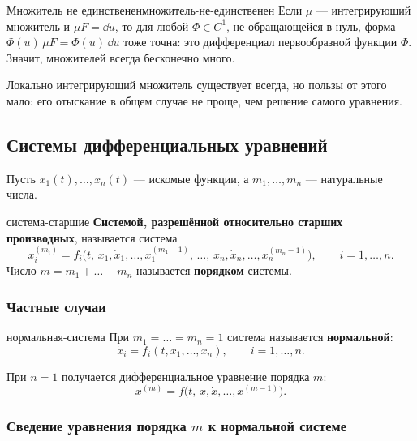\begin{Remark}[addon]{Множитель не единственен}{множитель-не-единственен}
	Если $\mu$ --- интегрирующий множитель и $\mu F = \dd u$, то для любой
	$\Phi \in C^1$, не обращающейся в нуль, форма
	$\Phi(u)\,\mu F = \Phi(u)\,\dd u$ тоже точна: это дифференциал
	первообразной функции $\Phi$. Значит, множителей всегда бесконечно много.

	\medskip
	Локально интегрирующий множитель существует всегда, но пользы от этого мало:
	его отыскание в общем случае не проще, чем решение самого уравнения.
\end{Remark}

\subsection{Системы дифференциальных уравнений}\label{sec:системы}

Пусть $x_1(t), \dots, x_n(t)$ --- искомые функции, а $m_1, \dots, m_n$ ---
натуральные числа.

\begin{Definition}{}{система-старшие}
	\textbf{Системой, разрешённой относительно старших производных},
	называется система
	\[
	x_i^{(m_i)} = f_i\bigl(t,\, x_1, \dot x_1, \dots, x_1^{(m_1-1)},\,
	\dots,\, x_n, \dot x_n, \dots, x_n^{(m_n-1)}\bigr),
	\qquad i = 1,\dots,n.
	\]
	Число $m = m_1 + \dots + m_n$ называется \textbf{порядком} системы.
\end{Definition}

\subsubsection*{Частные случаи}

\begin{Definition}{}{нормальная-система}
	При $m_1 = \dots = m_n = 1$ система называется \textbf{нормальной}:
	\[
	\dot x_i = f_i(t, x_1, \dots, x_n), \qquad i = 1,\dots,n.
	\]
\end{Definition}

При $n = 1$ получается дифференциальное уравнение порядка $m$:
\begin{equation}\label{eq:уравнение-порядка-m}
	x^{(m)} = f\bigl(t,\, x, \dot x, \dots, x^{(m-1)}\bigr).
\end{equation}

\subsubsection*{Сведение уравнения порядка $m$ к нормальной системе}

